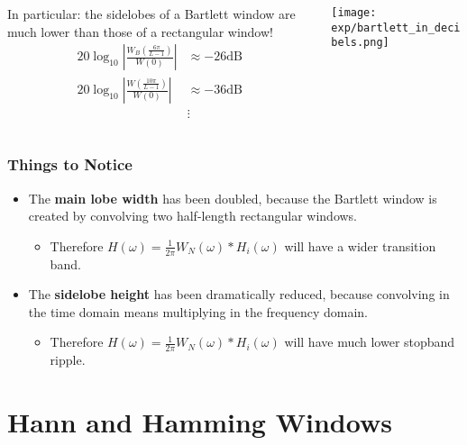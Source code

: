\documentclass{beamer}
\begin{document}
\begin{frame}
  \begin{columns}
    \begin{column}{0.5\textwidth}

      In particular: the sidelobes of a Bartlett window are much lower than those of a 
      rectangular window!
      \begin{align*}      
        20\log_{10}\left|\frac{W_B\left(\frac{6\pi}{L-1}\right)}{W(0)}\right| &
        \approx -26\mbox{dB}\\
        20\log_{10}\left|\frac{W\left(\frac{10\pi}{L-1}\right)}{W(0)}\right| &
        \approx -36\mbox{dB}\\
        & \vdots
      \end{align*}
    \end{column}
    \begin{column}{0.5\textwidth}
      \centerline{\texttt{[image: exp/bartlett\_in\_decibels.png]}}
    \end{column}
  \end{columns}
\end{frame}

\begin{frame}
  \frametitle{Things to Notice}

  \begin{itemize}
  \item The {\bf main lobe width} has been doubled, because the
    Bartlett window is created by convolving two half-length
    rectangular windows.
    \begin{itemize}
    \item Therefore $H(\omega)=\frac{1}{2\pi}W_N(\omega)\ast
      H_i(\omega)$ will have a wider transition band.
    \end{itemize}
  \item The {\bf sidelobe height} has been dramatically reduced,
    because convolving in the time domain means multiplying in the
    frequency domain.
    \begin{itemize}
    \item Therefore $H(\omega)=\frac{1}{2\pi}W_N(\omega)\ast
      H_i(\omega)$ will have much lower stopband ripple.
    \end{itemize}
  \end{itemize}
\end{frame}


\section[Hann and Hamming]{Hann and Hamming Windows}
\setcounter{subsection}{1}
\end{document}
